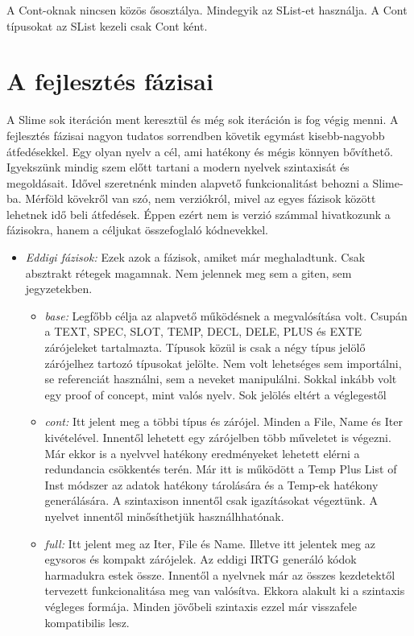 {A Cont-oknak nincsen közös ősosztálya.
Mindegyik az SList-et használja.
A Cont típusokat az SList kezeli csak Cont ként.



\section{A fejlesztés fázisai}
\label{sec:SStatesOfDevelopment}
A Slime sok iteráción ment keresztül és még sok iteráción is fog végig menni. 
A fejlesztés fázisai nagyon tudatos sorrendben követik egymást kisebb-nagyobb átfedésekkel.
Egy olyan nyelv a cél, ami hatékony és mégis könnyen bővíthető.
Igyekszünk mindig szem előtt tartani a modern nyelvek szintaxisát és megoldásait.
Idővel szeretnénk minden alapvető funkcionalitást behozni a Slime-ba.
Mérföld kövekről van szó, nem verziókról, mivel az egyes fázisok között lehetnek idő beli átfedések.
Éppen ezért nem is verzió számmal hivatkozunk a fázisokra, hanem a céljukat összefoglaló kódnevekkel.

\begin{itemize}
\item \emph{Eddigi fázisok:}
Ezek azok a fázisok, amiket már meghaladtunk.
Csak absztrakt rétegek magamnak.
Nem jelennek meg sem a giten, sem jegyzetekben.
\begin{itemize}
\item \emph{base:}
Legfőbb célja az alapvető működésnek a megvalósítása volt. 
Csupán a TEXT, SPEC, SLOT, TEMP, DECL, DELE, PLUS és EXTE zárójeleket tartalmazta.
Típusok közül is csak a négy típus jelölő zárójelhez tartozó típusokat jelölte.
Nem volt lehetséges sem importálni, se referenciát használni, sem a neveket manipulálni.
Sokkal inkább volt egy proof of concept, mint valós nyelv. 
Sok jelölés eltért a véglegestől
\item \emph{cont:}
Itt jelent meg a többi típus és zárójel.
Minden a File, Name és Iter kivételével.
Innentől lehetett egy zárójelben több műveletet is végezni.
Már ekkor is a nyelvvel hatékony eredményeket lehetett elérni a redundancia csökkentés terén.
Már itt is működött a Temp Plus List of Inst módszer az adatok hatékony tárolására és a Temp-ek
hatékony generálására.
A szintaxison innentől csak igazításokat végeztünk.
A nyelvet innentől minősíthetjük használhhatónak.
\item \emph{full:}
Itt jelent meg az Iter, File és Name.
Illetve itt jelentek meg az egysoros és kompakt zárójelek.
Az eddigi IRTG generáló kódok harmadukra estek össze.
Innentől a nyelvnek már az összes kezdetektől tervezett funkcionalitása meg van valósítva.
Ekkora alakult ki a szintaxis végleges formája.
Minden jövőbeli szintaxis ezzel már visszafele kompatibilis lesz.
\end{itemize}


\end{itemize}}
